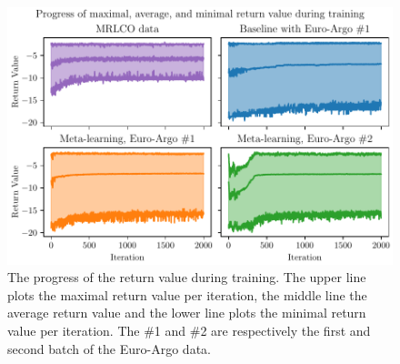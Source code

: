 \begin{figure}[htp!]
    \centering
    \includegraphics[width=\textwidth]{./fig/return.pdf}
    \caption{The progress of the return value during training. The upper line
    plots the maximal return value per iteration, the middle line the average
    return value and the lower line plots the minimal return value per
    iteration. The \#1 and \#2 are respectively the first and second batch of
    the Euro-Argo data.}
    \label{fig:return}
\end{figure}
